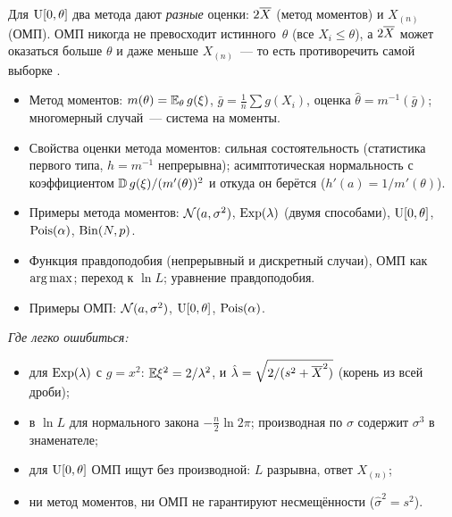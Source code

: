 \begin{addendum}
  Для $\mathrm{U}[0, \theta]$ два метода дают \emph{разные} оценки: $2\overline{X}$ (метод моментов) и
  $X_{(n)}$ (ОМП). ОМП никогда не превосходит истинного~$\theta$ (все $X_i \le \theta$),
  а $2\overline{X}$ может оказаться больше $\theta$ и даже меньше $X_{(n)}$~--- то есть
  противоречить самой выборке \cite[гл.~15, пример~2.2]{bure}.
\end{addendum}

\begin{keybox}
  \begin{itemize}
    \item Метод моментов: $m(\theta) = \mathbb{E}_\theta\, g(\xi)$, $\bar g = \frac1n \sum g(X_i)$,
          оценка $\hat\theta = m^{-1}(\bar g)$; многомерный случай~--- система на моменты.
    \item Свойства оценки метода моментов: сильная состоятельность (статистика первого типа,
          $h = m^{-1}$ непрерывна); асимптотическая нормальность с коэффициентом
          $\operatorname{\mathbb{D}} g(\xi) / (m'(\theta))^2$ и откуда он берётся ($h'(a) = 1/m'(\theta)$).
    \item Примеры метода моментов: $\mathcal{N}(a, \sigma^2)$, $\mathrm{Exp}(\lambda)$ (двумя способами),
          $\mathrm{U}[0, \theta]$, $\mathrm{Pois}(\alpha)$, $\mathrm{Bin}(N, p)$.
    \item Функция правдоподобия (непрерывный и дискретный случаи), ОМП как $\operatorname*{arg\,max}$;
          переход к $\ln L$; уравнение правдоподобия.
    \item Примеры ОМП: $\mathcal{N}(a, \sigma^2)$, $\mathrm{U}[0, \theta]$, $\mathrm{Pois}(\alpha)$.
  \end{itemize}
  \emph{Где легко ошибиться:}
  \begin{itemize}
    \item для $\mathrm{Exp}(\lambda)$ с $g = x^2$: $\mathbb{E}\xi^2 = 2/\lambda^2$, и
          $\hat\lambda = \sqrt{2/(s^2 + \overline{X}^2)}$ (корень из всей дроби);
    \item в $\ln L$ для нормального закона $-\frac n2 \ln 2\pi$; производная по $\sigma$
          содержит $\sigma^3$ в знаменателе;
    \item для $\mathrm{U}[0, \theta]$ ОМП ищут без производной: $L$ разрывна, ответ $X_{(n)}$;
    \item ни метод моментов, ни ОМП не гарантируют несмещённости ($\hat\sigma^2 = s^2$).
  \end{itemize}
\end{keybox}
